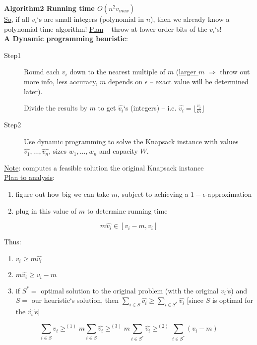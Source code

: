 \documentclass[a4paper,12pt]{article}
\theoremstyle{plain}
\theoremstyle{definition}
\theoremstyle{remark}
\begin{document}
\textbf{Algorithm2 Running time $O(n^2 v_{max})$}
\\

\underline{So}, if all $v_i$`s are small integers (polynomial in $n$), then we already know a polynomial-time algorithm! \underline{Plan} -- throw at lower-order bits of the $v_i$`s!
\\

\textbf{A Dynamic programming heuristic}:
\begin{description}
	\item[Step1] Round each $v_i$ down to the nearest multiple of $m$ (\underline{larger $m$} $\Rightarrow$ throw out more info, \underline{less accuracy}, $m$ depends on $\epsilon$ -- exact value will be determined later).

	Divide the results by $m$ to get $\widehat{v_i}$`s (integers) -- i.e. $\widehat{v_i} = \lfloor \frac{v_i}{m} \rfloor$
	\item[Step2] Use dynamic programming to solve the Knapsack instance with values $\widehat{v_1}, \dots, \widehat{v_n}$, sizes $w_1, \dots, w_n$ and capacity $W$.
\end{description}

\underline{Note}: computes a feasible solution the original Knapsack instance
\\

\underline{Plan to analysis}:
\begin{enumerate}
	\item figure out how big we can take $m$, subject to achieving a $1-\epsilon$-approximation
	\item plug in this value of $m$ to determine running time
\end{enumerate}

\[
m\widehat{v_i} \in [v_i - m, v_i]
\]

Thus:
\begin{enumerate}
	\item $v_i \geq m\widehat{v_i}$
	\item $m\widehat{v_i} \geq v_i - m$
	\item if $S^* =$ optimal solution to the original problem (with the original $v_i$`s) and $S =$ our heuristic`s solution, then $\sum\limits_{i \in S} \widehat{v_i} \geq \sum\limits_{i \in S^*} \widehat{v_i}$ [since $S$ is optimal for the $\widehat{v_i}$`s]
\end{enumerate}

\[
\sum\limits_{i \in S} v_i \geq^{(1)} m \sum\limits_{i \in S} \widehat{v_i} \geq^{(3)} m \sum\limits_{i \in S^*} \widehat{v_i} \geq^{(2)} \sum\limits_{i \in S^*} (v_i - m)
\]
\end{document}
